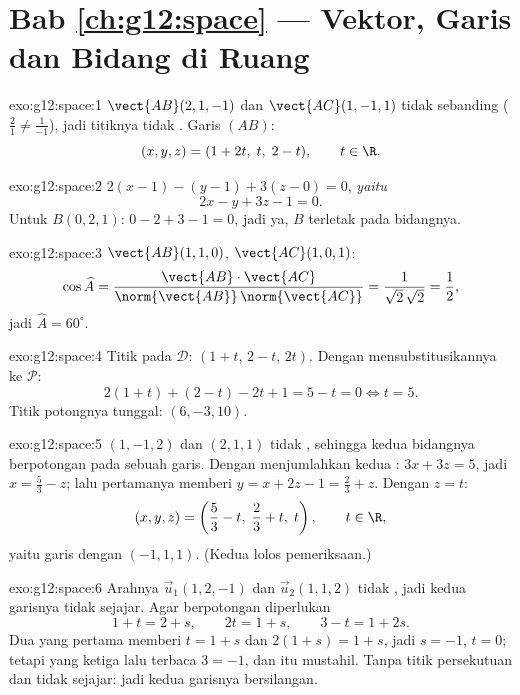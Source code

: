 \section*{Bab \ref{ch:g12:space} --- Vektor, Garis dan Bidang di Ruang}

\begin{solution}{exo:g12:space:1}
$\vect{AB}(2, 1, -1)$ dan $\vect{AC}(1, -1, 1)$ tidak sebanding
($\frac21 \neq \frac{1}{-1}$), jadi titiknya tidak . Garis $(AB)$:
\[
(x, y, z) = (1 + 2t,\; t,\; 2 - t), \qquad t \in \R .
\]
\end{solution}

\begin{solution}{exo:g12:space:2}
$2(x - 1) - (y - 1) + 3(z - 0) = 0$, \emph{yaitu}
\[
2x - y + 3z - 1 = 0 .
\]
Untuk $B(0,2,1)$: $0 - 2 + 3 - 1 = 0$, jadi ya, $B$ terletak pada bidangnya.
\end{solution}

\begin{solution}{exo:g12:space:3}
$\vect{AB}(1,1,0)$, $\vect{AC}(1,0,1)$:
\[
\cos\widehat{A}
= \frac{\vect{AB}\cdot\vect{AC}}{\norm{\vect{AB}}\,\norm{\vect{AC}}}
= \frac{1}{\sqrt2\,\sqrt2} = \frac12,
\]
jadi $\widehat A = 60^\circ$.
\end{solution}

\begin{solution}{exo:g12:space:4}
Titik pada $\mathcal D$: $(1 + t,\, 2 - t,\, 2t)$. Dengan mensubstitusikannya ke
 $\mathcal P$:
\[
2(1+t) + (2 - t) - 2t + 1 = 5 - t = 0 \iff t = 5 .
\]
Titik potongnya tunggal: $(6, -3, 10)$.
\end{solution}

\begin{solution}{exo:g12:space:5}
 $(1, -1, 2)$ dan $(2, 1, 1)$ tidak , sehingga kedua
bidangnya berpotongan pada sebuah garis. Dengan menjumlahkan kedua :
$3x + 3z = 5$, jadi $x = \frac53 - z$; lalu  pertamanya memberi
$y = x + 2z - 1 = \frac23 + z$. Dengan $z = t$:
\[
(x, y, z) = \left(\frac53 - t,\; \frac23 + t,\; t\right), \qquad t \in \R,
\]
yaitu garis dengan  $(-1, 1, 1)$. (Kedua  lolos
pemeriksaan.)
\end{solution}

\begin{solution}{exo:g12:space:6}
Arahnya $\vec u_1(1, 2, -1)$ dan $\vec u_2(1, 1, 2)$ tidak ,
jadi kedua garisnya tidak sejajar. Agar berpotongan diperlukan
\[
1 + t = 2 + s, \qquad 2t = 1 + s, \qquad 3 - t = 1 + 2s .
\]
Dua yang pertama memberi $t = 1 + s$ dan $2(1+s) = 1 + s$, jadi $s = -1$, $t = 0$;
tetapi yang ketiga lalu terbaca $3 = -1$, dan itu mustahil. Tanpa titik persekutuan
dan tidak sejajar: jadi kedua garisnya bersilangan.
\end{solution}

